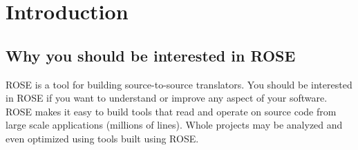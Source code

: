 \chapter{ Introduction }

\label{introduction:introduction}




\section{Why you should be interested in ROSE}
ROSE is a tool for building source-to-source translators.
You should be interested in ROSE if you want to 
understand or improve any aspect of your software. ROSE
makes it easy to build tools that read and operate on source code
from large scale applications (millions of lines).  Whole projects
may be analyzed and even optimized using tools built using ROSE.

